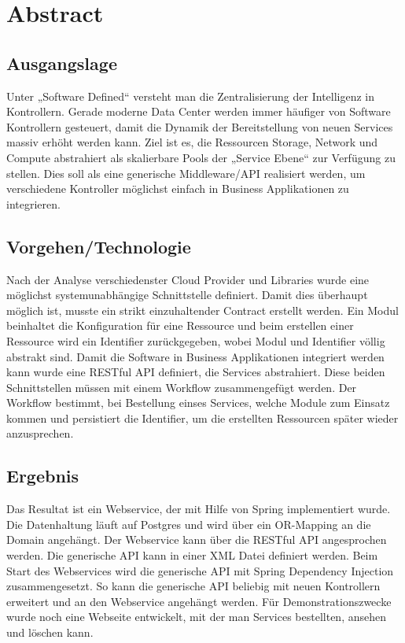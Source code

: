 \chapter*{Abstract}
\section{Ausgangslage}
Unter „Software Defined“ versteht man die Zentralisierung der Intelligenz in Kontrollern. Gerade moderne Data Center werden immer häufiger von Software Kontrollern gesteuert, damit die Dynamik der Bereitstellung von neuen Services massiv erhöht werden kann. 
Ziel ist es, die Ressourcen Storage, Network und Compute abstrahiert als skalierbare Pools der „Service Ebene“ zur Verfügung zu stellen. Dies soll als eine generische Middleware/API realisiert werden, um verschiedene Kontroller möglichst einfach in Business Applikationen zu integrieren.

\section{Vorgehen/Technologie}
Nach der Analyse verschiedenster Cloud Provider und Libraries wurde eine möglichst systemunabhängige Schnittstelle definiert. Damit dies überhaupt möglich ist, musste ein strikt einzuhaltender Contract erstellt werden. Ein Modul beinhaltet die Konfiguration für eine Ressource und beim erstellen einer Ressource wird ein Identifier zurückgegeben, wobei Modul und Identifier völlig abstrakt sind. Damit die Software in Business Applikationen integriert werden kann wurde eine RESTful API definiert, die Services abstrahiert. Diese beiden Schnittstellen müssen mit einem Workflow zusammengefügt werden. Der Workflow bestimmt, bei Bestellung einses Services,  welche Module zum Einsatz kommen und persistiert die Identifier, um die erstellten Ressourcen später wieder anzusprechen.

\section{Ergebnis}
Das Resultat ist ein Webservice, der mit Hilfe von Spring implementiert wurde. Die Datenhaltung läuft auf Postgres und wird über ein OR-Mapping an die Domain angehängt. Der Webservice kann über die RESTful API angesprochen werden. Die generische API kann in einer XML Datei definiert werden. Beim Start des Webservices wird die generische API mit Spring Dependency Injection zusammengesetzt. So kann die generische API beliebig mit neuen Kontrollern erweitert und an den Webservice angehängt werden. Für Demonstrationszwecke wurde noch eine Webseite entwickelt, mit der man Services bestellten, ansehen und löschen kann.